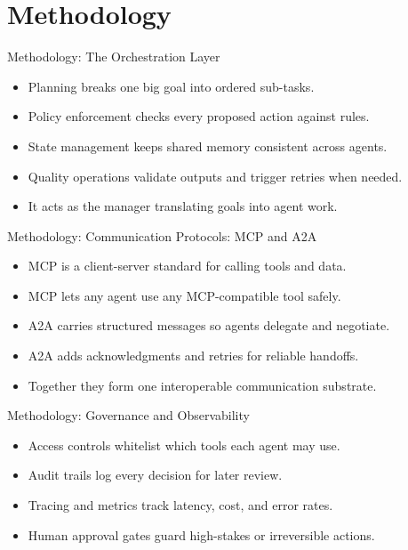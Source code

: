 \documentclass[10pt]{beamer}
\begin{document}
\section{Methodology}
\begin{frame}[allowframebreaks]{Methodology: The Orchestration Layer}
\begin{itemize}
  \item Planning breaks one big goal into ordered sub-tasks.
  \item Policy enforcement checks every proposed action against rules.
  \item State management keeps shared memory consistent across agents.
  \item Quality operations validate outputs and trigger retries when needed.
  \item It acts as the manager translating goals into agent work.
\end{itemize}
\end{frame}
\begin{frame}[allowframebreaks]{Methodology: Communication Protocols: MCP and A2A}
\begin{itemize}
  \item MCP is a client-server standard for calling tools and data.
  \item MCP lets any agent use any MCP-compatible tool safely.
  \item A2A carries structured messages so agents delegate and negotiate.
  \item A2A adds acknowledgments and retries for reliable handoffs.
  \item Together they form one interoperable communication substrate.
\end{itemize}
\end{frame}
\begin{frame}[allowframebreaks]{Methodology: Governance and Observability}
\begin{itemize}
  \item Access controls whitelist which tools each agent may use.
  \item Audit trails log every decision for later review.
  \item Tracing and metrics track latency, cost, and error rates.
  \item Human approval gates guard high-stakes or irreversible actions.
\end{itemize}
\end{frame}
\end{document}
